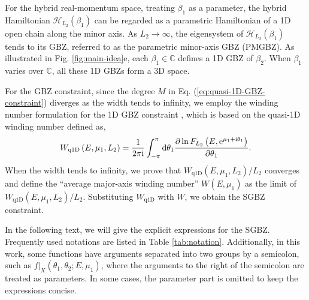 For the hybrid real-momentum space, treating $\beta_{1}$ as a parameter,
the hybrid Hamiltonian $\mathcal{H}_{L_{2}}(\beta_{1})$ can be regarded
as a parametric Hamiltonian of a 1D open chain along the minor axis.
As $L_{2}\rightarrow\infty$, the eigensystem of $\mathcal{H}_{L_{2}}(\beta_{1})$
tends to its GBZ, referred to as the parametric minor-axis GBZ (PMGBZ).
As illustrated in Fig. \ref{fig:main-idea}e, each $\beta_{1}\in\mathbb{C}$
defines a 1D GBZ of $\beta_{2}$. When $\beta_{1}$ varies over $\mathbb{C}$,
all these 1D GBZs form a 3D space.

For the GBZ constraint, since the degree $M$ in Eq. (\ref{eq:quasi-1D-GBZ-constraint})
diverges as the width tends to infinity, we employ the winding number
formulation for the 1D GBZ constraint \cite{zhangCorrespondenceWindingNumbers2020},
which is based on the quasi-1D winding number defined as, 
\begin{equation}
W_{\text{q1D}}\left(E,\mu_{1},L_{2}\right)=\frac{1}{2\pi\mathrm{i}}\int_{-\pi}^{\pi}\mathrm{d}\theta_{1}\frac{\partial\ln F_{L_{2}}\left(E,\mathrm{e}^{\mu_{1}+\mathrm{i}\theta_{1}}\right)}{\partial\theta_{1}}.\label{eq:definition-winding-number-quasi-1D}
\end{equation}
When the width tends to infinity, we prove that $W_{\text{q1D}}(E,\mu_{1},L_{2})/L_{2}$
converges and define the ``average major-axis winding number'' $W(E,\mu_{1})$
as the limit of $W_{\text{q1D}}(E,\mu_{1},L_{2})/L_{2}$. Substituting
$W_{\text{q1D}}$ with $W$, we obtain the SGBZ constraint.

In the following text, we will give the explicit expressions for the
SGBZ. Frequently used notations are listed in Table \ref{tab:notation}.
Additionally, in this work, some functions have arguments separated
into two groups by a semicolon, such as $f|_{X}(\theta_{1},\theta_{2};E,\mu_{1})$,
where the arguments to the right of the semicolon are treated as parameters.
In some cases, the parameter part is omitted to keep the expressions
concise.

